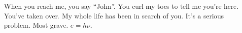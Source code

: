 

When you reach me, you say ``John''.  You curl my toes to tell me
you're here.  You've taken over.  My whole life has been in search of
you.  It's a serious problem.  Most grave.  $e = h\nu$.

\bye

